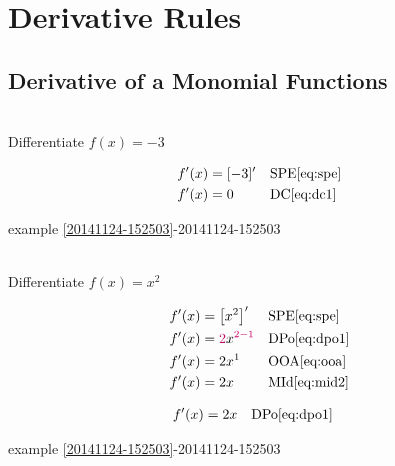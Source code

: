 \documentclass[20150903-160354-rs2.2-MarksMathNotebook.tex]{subfiles}
\begin{document}
%
%

\chapter{Derivative Rules}

\section{Derivative of a Monomial Functions}



\begin{example}[id:20141124-153017] \label{20141124-153017} \hfill \\

Differentiate $f(x)=-3$

\soln

\solnsteps
\begin{align*}
f'(x) &= [-3]' && \text{SPE} \eqref{eq:spe} \\
f'(x) &= 0 && \text{DC} \eqref{eq:dc1}
\end{align*}

\qdepend

\qdependlist

example \ref{20141124-152503}-20141124-152503


\end{example}


\begin{example}[id:20141124-141850] \label{20141124-141850} \hfill \\

Differentiate $f(x)=x^2$

\soln

\solnsteps
\begin{align*}
f'(x) &= \left[x^2\right]' && \text{SPE} \eqref{eq:spe} \\
f'(x) &= \cRed{2}x^{\cRed{2-1}} && \text{DPo} \eqref{eq:dpo1} \\
f'(x) &= 2x^1 && \text{OOA} \eqref{eq:ooa} \\
f'(x) &= 2x && \text{MId} \eqref{eq:mid2}
\end{align*}

\soln

\lesssteps
\begin{align*}
f'(x) & = 2x && \text{DPo} \eqref{eq:dpo1}
\end{align*}

\qdepend

\qdependlist

example \ref{20141124-152503}-20141124-152503



\end{example}
\end{document}

